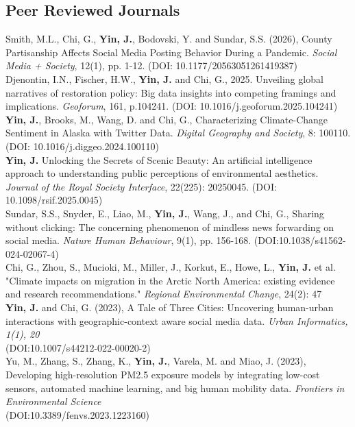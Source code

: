 \documentclass[11pt, a4paper]{article}
\newcommand{\years}[1]{\marginnote{\scriptsize #1}}
\begin{document}
\subsection*{Peer Reviewed Journals}
\years{2026}Smith, M.L., Chi, G., \textbf{Yin, J.}, Bodovski, Y. and Sundar, S.S. (2026), County Partisanship Affects Social Media Posting Behavior During a Pandemic. \textit{Social Media + Society}, 12(1), pp. 1-12. (DOI: 10.1177/20563051261419387)\\
\years{2025}Djenontin, I.N., Fischer, H.W., \textbf{Yin, J.} and Chi, G., 2025. Unveiling global narratives of restoration policy: Big data insights into competing framings and implications. \textit{Geoforum}, 161, p.104241. (DOI: 10.1016/j.geoforum.2025.104241)\\
\years{2025} \textbf{Yin, J.},  Brooks, M., Wang, D. and Chi, G., Characterizing Climate-Change Sentiment in Alaska with Twitter Data. \textit{Digital Geography and Society}, 8: 100110.  \\(DOI: 10.1016/j.diggeo.2024.100110)\\
\years{2025}\textbf{Yin, J.} Unlocking the Secrets of Scenic Beauty:  An artificial intelligence approach to understanding public perceptions of environmental aesthetics. \textit{Journal of the Royal Society Interface}, 22(225): 20250045. (DOI: 10.1098/rsif.2025.0045)\\
\years{2025}Sundar, S.S., Snyder, E., Liao, M., \textbf{Yin, J.}, Wang, J., and Chi, G., Sharing without clicking: The concerning phenomenon of mindless news forwarding on social media. \textit{Nature Human Behaviour}, 9(1), pp. 156-168. (DOI:10.1038/s41562-024-02067-4)\\
\years{2024}Chi, G., Zhou, S., Mucioki, M., Miller, J., Korkut, E., Howe, L., \textbf{Yin, J.} et al. "Climate impacts on migration in the Arctic North America: existing evidence and research recommendations." \textit{Regional Environmental Change}, 24(2): 47\\
\years{2023}\textbf{Yin, J.} and Chi, G. (2023), A Tale of Three Cities: Uncovering human-urban interactions with geographic-context aware social media data. \textit{Urban Informatics, 1(1), 20}\\(DOI:10.1007/s44212-022-00020-2)\\
\years{2023}Yu, M., Zhang, S., Zhang, K., \textbf{Yin, J.}, Varela, M. and Miao, J. (2023), Developing high-resolution PM2.5 exposure models by integrating low-cost sensors, automated machine learning, and big human mobility data. \textit{Frontiers in Environmental Science} \\(DOI:10.3389/fenvs.2023.1223160)\\
\end{document}
